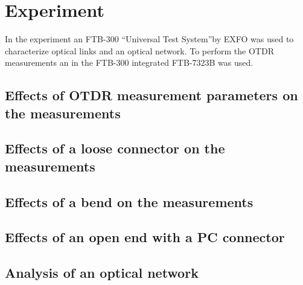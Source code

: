 \chapter{Experiment}
\label{ch:exp}
In the experiment an FTB-300 ``Universal Test System''by EXFO was used to characterize optical links and an optical network. To perform the OTDR measurements an in the FTB-300 integrated FTB-7323B was used.

\section{Effects of OTDR measurement parameters on the measurements}


\section{Effects of a loose connector on the measurements}


\section{Effects of a bend on the measurements}

\section{Effects of an open end with a PC connector}

\section{Analysis of an optical network}



